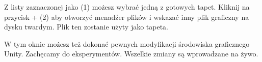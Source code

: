 Z listy zaznaczonej jako (1) możesz wybrać jedną z gotowych tapet. Kliknij na przycisk + (2) aby otworzyć menadźer plików i wskazać inny plik graficzny na dysku twardym. Plik ten zostanie użyty jako tapeta.

W tym oknie możesz też dokonać pewnych modyfikacji środowiska graficznego Unity. Zachęcamy do eksperymentów. Wszelkie zmiany są wprowadzane na żywo.
\clearpage

